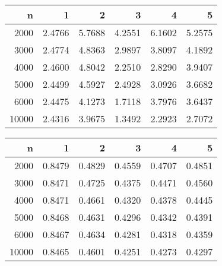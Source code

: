 \begin{table}[ht]
\centering
\begin{tabular}{rrrrrr}
  \hline
n & 1 & 2 & 3 & 4 & 5 \\ 
  \hline
2000 & 2.4766 & 5.7688 & 4.2551 & 6.1602 & 5.2575 \\ 
  3000 & 2.4774 & 4.8363 & 2.9897 & 3.8097 & 4.1892 \\ 
  4000 & 2.4600 & 4.8042 & 2.2510 & 2.8290 & 3.9407 \\ 
  5000 & 2.4499 & 4.5927 & 2.4928 & 3.0926 & 3.6682 \\ 
  6000 & 2.4475 & 4.1273 & 1.7118 & 3.7976 & 3.6437 \\ 
  10000 & 2.4316 & 3.9675 & 1.3492 & 2.2923 & 2.7072 \\ 
   \hline
\end{tabular}
\end{table}
\begin{table}[ht]
\centering
\begin{tabular}{rrrrrr}
  \hline
n & 1 & 2 & 3 & 4 & 5 \\ 
  \hline
2000 & 0.8479 & 0.4829 & 0.4559 & 0.4707 & 0.4851 \\ 
  3000 & 0.8471 & 0.4725 & 0.4375 & 0.4471 & 0.4560 \\ 
  4000 & 0.8471 & 0.4661 & 0.4320 & 0.4378 & 0.4445 \\ 
  5000 & 0.8468 & 0.4631 & 0.4296 & 0.4342 & 0.4391 \\ 
  6000 & 0.8467 & 0.4634 & 0.4281 & 0.4318 & 0.4359 \\ 
  10000 & 0.8465 & 0.4601 & 0.4251 & 0.4273 & 0.4297 \\ 
   \hline
\end{tabular}
\end{table}
